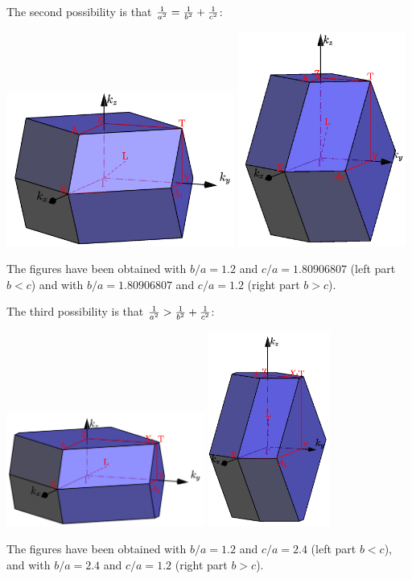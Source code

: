 \documentclass[12pt,a4paper]{article}
\begin{document}
The second possibility is that ${1\over a^2} =
{1\over b^2} + {1\over c^2}$:
\begin{center}
\includegraphics[width=7.5cm,angle=0]{images/ofc_13.png} \hspace{1cm}
\includegraphics[width=5.5cm,angle=0]{images/ofc_14.png} 
\end{center}
The figures have been obtained with $b/a=1.2$ and $c/a=1.80906807$ 
(left part $b<c$) and with $b/a=1.80906807$ and $c/a=1.2$ (right part $b>c$).

The third possibility is that ${1 \over a^2} > {1\over b^2} + {1\over c^2}$:
\begin{center}
\includegraphics[width=6.5cm,angle=0]{images/ofc_7.png} \hspace{1cm}
\includegraphics[width=4.0cm,angle=0]{images/ofc_8.png} 
\end{center}
The figures have been obtained with $b/a=1.2$ and $c/a=2.4$ (left part $b<c$), 
and with $b/a=2.4$ and $c/a=1.2$ (right part $b>c$).
\end{document}
